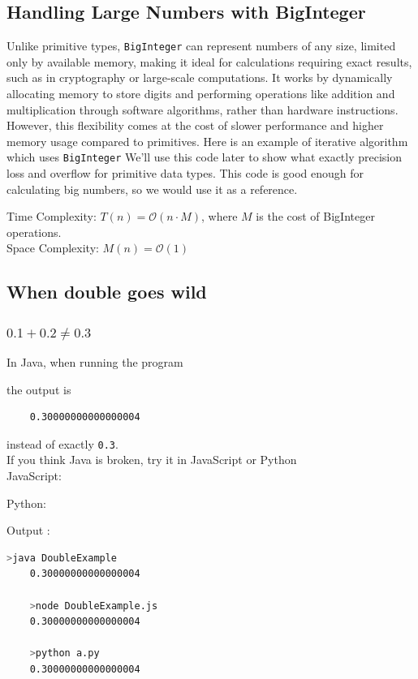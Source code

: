 \documentclass{article}
\begin{document}
\subsection{Handling Large Numbers with BigInteger}
Unlike primitive types, \texttt{BigInteger} can represent numbers of any size, limited only by available memory, making it ideal for calculations requiring exact results, such as in cryptography or large-scale computations. It works by dynamically allocating memory to store digits and performing operations like addition and multiplication through software algorithms, rather than hardware instructions. However, this flexibility comes at the cost of slower performance and higher memory usage compared to primitives.
Here is an example of iterative algorithm which uses \texttt{BigInteger}
We'll use this code later to show what exactly precision loss and overflow for primitive data types. This code is good enough for calculating big numbers, so we would use it as a reference.

Time Complexity: $T(n) = \mathcal{O}(n \cdot M)$, where $M$ is the cost of BigInteger operations. \\
Space Complexity: $M(n) = \mathcal{O}(1)$

\subsection{When double goes wild}
\subsubsection{$0.1 + 0.2 \ne 0.3$}
In Java, when running the program

the output is
\begin{verbatim}
	0.30000000000000004
\end{verbatim}
instead of exactly \texttt{0.3}. \\

If you think Java is broken, try it in JavaScript or Python\\
JavaScript:

Python:

Output :
\begin{lstlisting}[language=bash]
	>java DoubleExample
	0.30000000000000004
	
	>node DoubleExample.js
	0.30000000000000004
	
	>python a.py
	0.30000000000000004	
\end{lstlisting}
\end{document}
